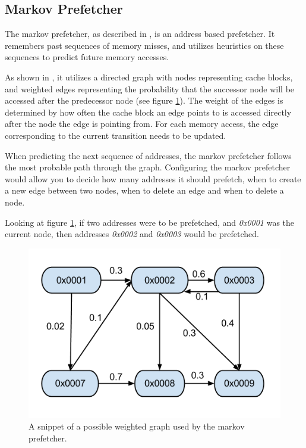 \subsection{Markov Prefetcher}
\label{sec:markovPrefetcher}
The markov prefetcher, as described in \cite{Grannas}, is an address based prefetcher. It remembers past sequences of memory misses, and utilizes heuristics on these sequences to predict future memory accesses.

As shown in \cite{Joseph}, it utilizes a directed graph with nodes representing cache blocks, and weighted edges representing the probability that the successor node will be accessed after the predecessor node (see figure \ref{fig:markov}). The weight of the edges is determined by how often the cache block an edge points to is accessed directly after the node the edge is pointing from. For each memory access, the edge corresponding to the current transition needs to be updated. 

When predicting the next sequence of addresses, the markov prefetcher follows the most probable path through the graph. Configuring the markov prefetcher would allow you to decide how many addresses it should prefetch, when to create a new edge between two nodes, when to delete an edge and when to delete a node.

Looking at figure \ref{fig:markov}, if two addresses were to be prefetched, and \emph{0x0001} was the current node, then addresses \emph{0x0002} and \emph{0x0003} would be prefetched.

\begin{figure}[H]
\includegraphics[scale=0.5]{./figures/markov}
\caption{\label{fig:markov}A snippet of a possible weighted graph used by the markov prefetcher.}
\end{figure}


